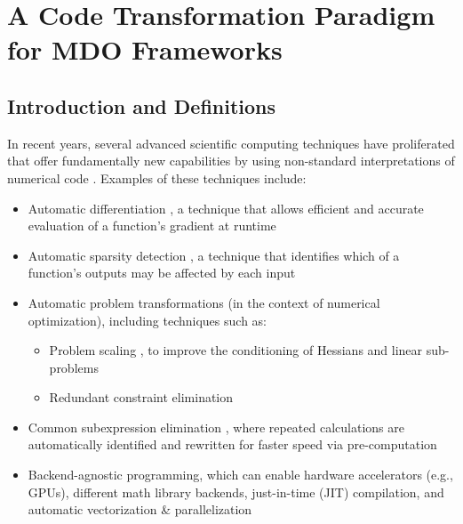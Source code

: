 \chapter{A Code Transformation Paradigm for MDO Frameworks}
\label{chap:code_transformations}


\section{Introduction and Definitions}

In recent years, several advanced scientific computing techniques have proliferated that offer fundamentally new capabilities by using non-standard interpretations of numerical code \cite{rackauckas_generalizing_2021}. Examples of these techniques include:

\begin{itemize}[noitemsep]
    \item Automatic differentiation \cite{griewank_automatic_1988}, a technique that allows efficient and accurate evaluation of a function's gradient at runtime
    \item Automatic sparsity detection \cite{gebremedhin_efficient_2009}, a technique that identifies which of a function's outputs may be affected by each input
    \item Automatic problem transformations (in the context of numerical optimization), including techniques such as:
    \begin{itemize}[noitemsep]
        \item Problem scaling \cite{nocedal_numerical_2006}, to improve the conditioning of Hessians and linear sub-problems
        \item Redundant constraint elimination
    \end{itemize}
    \item Common subexpression elimination \cite{casadi}, where repeated calculations are automatically identified and rewritten for faster speed via pre-computation
    \item Backend-agnostic programming, which can enable hardware accelerators (e.g., GPUs), different math library backends, just-in-time (JIT) compilation, and automatic vectorization \& parallelization \cite{jax}
\end{itemize}

